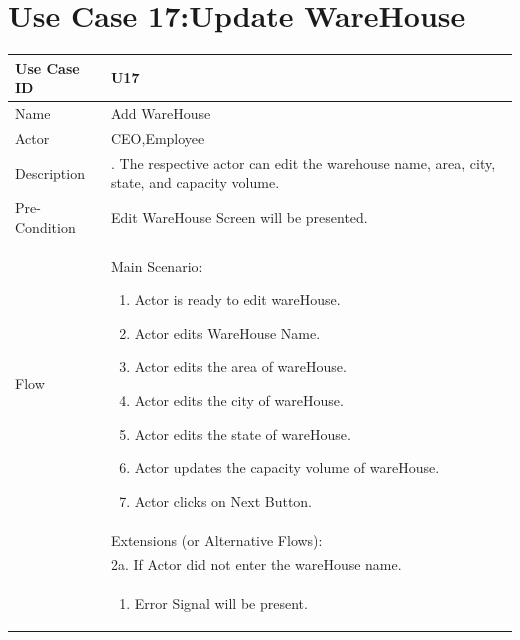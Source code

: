 \documentclass[12pt,a4paper]{report}
\begin{document}


\section{Use Case 17:Update WareHouse}

\begin{tabular}{ | m{3cm} | m{12cm}| } \hline

Use Case ID & U17  \\\hline

Name  	    & Add WareHouse  \\ \hline

Actor     	& CEO,Employee\\ \hline

Description &  . The respective actor can edit the warehouse name, area, city, state, and capacity volume.  \\ \hline

Pre-Condition &  Edit WareHouse Screen will be presented. \\ \hline

Flow       & Main Scenario:

\begin{enumerate}
\item Actor is ready to edit wareHouse.
\item Actor edits WareHouse Name.
\item Actor edits the area of wareHouse.
\item Actor edits the city of wareHouse.
\item Actor edits the state of wareHouse.
\item Actor updates the capacity volume of wareHouse.
\item Actor clicks on Next Button.

\end{enumerate}\\


&Extensions (or Alternative Flows):\\
& 2a. If Actor did not enter the wareHouse name. \\
& \begin{enumerate}
		\item Error Signal will be present.
	\end{enumerate}
\\ \hline
\end{tabular}
\end{document}
